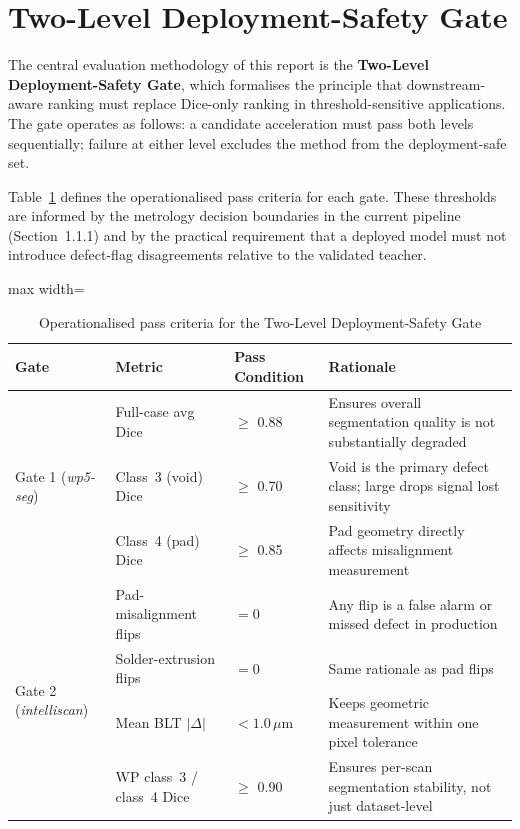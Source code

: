 \hypertarget{two-level-deployment-safety-gate}{%
\section{Two-Level Deployment-Safety
Gate}\label{two-level-deployment-safety-gate}}

The central evaluation methodology of this report is the \textbf{Two-Level Deployment-Safety Gate}, which formalises the principle that downstream-aware ranking must replace Dice-only ranking in threshold-sensitive applications. The gate operates as follows: a candidate acceleration must pass both levels sequentially; failure at either level excludes the method from the deployment-safe set.

Table~\ref{tab:gate-criteria} defines the operationalised pass criteria for each gate. These thresholds are informed by the metrology decision boundaries in the current pipeline (Section~1.1.1) and by the practical requirement that a deployed model must not introduce defect-flag disagreements relative to the validated teacher.

\begin{table}[H]
\centering
\caption{Operationalised pass criteria for the Two-Level Deployment-Safety Gate}
\label{tab:gate-criteria}
\renewcommand{\arraystretch}{1.2}
\begin{adjustbox}{max width=\textwidth}
\begin{tabular}{l l l p{}}
\toprule
\textbf{Gate} & \textbf{Metric} & \textbf{Pass Condition} & \textbf{Rationale} \\
\midrule
\multirow{3}{*}{Gate 1 (\emph{wp5-seg})}
  & Full-case avg Dice  & $\geq$ 0.88  & Ensures overall segmentation quality is not substantially degraded \\
  & Class~3 (void) Dice & $\geq$ 0.70  & Void is the primary defect class; large drops signal lost sensitivity \\
  & Class~4 (pad) Dice  & $\geq$ 0.85  & Pad geometry directly affects misalignment measurement \\
\midrule
\multirow{4}{*}{Gate 2 (\emph{intelliscan})}
  & Pad-misalignment flips   & $= 0$  & Any flip is a false alarm or missed defect in production \\
  & Solder-extrusion flips   & $= 0$  & Same rationale as pad flips \\
  & Mean BLT $|\Delta|$      & $< 1.0\,\mu$m & Keeps geometric measurement within one pixel tolerance \\
  & WP class~3 / class~4 Dice & $\geq$ 0.90 & Ensures per-scan segmentation stability, not just dataset-level \\
\bottomrule
\end{tabular}
\end{adjustbox}
\end{table}

